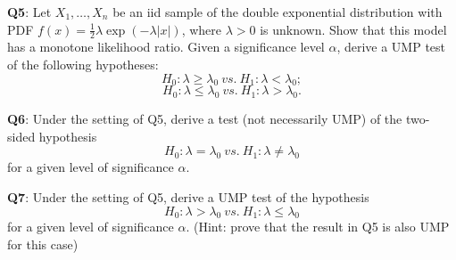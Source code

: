 \documentclass[]{article}
\begin{document}
\textbf{Q5}: Let \(X_1,\dots,X_n\) be an iid sample of the double
exponential distribution with PDF
\(f(x) = \frac 12\lambda\exp(-\lambda|x|)\), where \(\lambda>0\) is
unknown. Show that this model has a monotone likelihood ratio. Given a
significance level \(\alpha\), derive a UMP test of the following
hypotheses: \[H_0:\lambda \ge \lambda_0\ vs.\ H_1:\lambda < \lambda_0;\]
\[H_0:\lambda \le \lambda_0\ vs.\ H_1:\lambda > \lambda_0.\]

\textbf{Q6}: Under the setting of Q5, derive a test (not necessarily
UMP) of the two-sided hypothesis
\[H_0:\lambda =\lambda_0\ vs.\ H_1:\lambda \neq \lambda_0\] for a given
level of significance \(\alpha\).

\textbf{Q7}: Under the setting of Q5, derive a UMP test of the
hypothesis \[H_0:\lambda > \lambda_0\ vs.\ H_1:\lambda \le \lambda_0\]
for a given level of significance \(\alpha\). (Hint: prove that the
result in Q5 is also UMP for this case)
\end{document}
